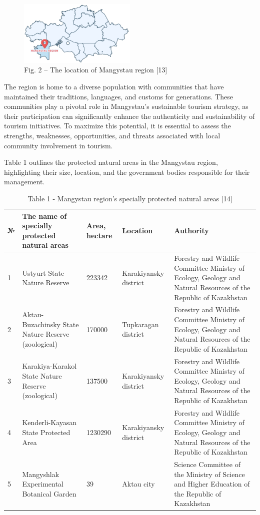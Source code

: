 \begin{figure}[H]
	\centering
	\includegraphics[width=0.5\textwidth]{assets/338}
	\caption*{Fig. 2 -- The location of Mangystau region {[}13{]}}
\end{figure}

\begin{multicols}{2}
The region is home to a diverse population with communities that have
maintained their traditions, languages, and customs for generations.
These communities play a pivotal role in Mangystau's sustainable tourism
strategy, as their participation can significantly enhance the
authenticity and sustainability of tourism initiatives. To maximize this
potential, it is essential to assess the strengths, weaknesses,
opportunities, and threats associated with local community involvement
in tourism.

Table 1 outlines the protected natural areas in the Mangystau region,
highlighting their size, location, and the government bodies responsible
for their management.
\end{multicols}

\begin{table}[H]
\caption*{Table 1 - Mangystau region's specially protected natural areas {[}14{]}}
\centering
\begin{tabular}{|l|p{}|p{}|p{}|p{}|}
\hline
№ & The name of specially protected natural areas & Area, hectare & Location & Authority \\ \hline
1 &
  Ustyurt State Nature Reserve &
  223342 &
  Karakiyansky district &
  Forestry and Wildlife Committee Ministry of Ecology, Geology and Natural Resources of the Republic of Kazakhstan \\ \hline
2 &
  Aktau-Buzachinsky State Nature Reserve (zoological) &
  170000 &
  Tupkaragan district &
  Forestry and Wildlife Committee Ministry of Ecology, Geology and Natural Resources of the Republic of Kazakhstan \\ \hline
3 &
  Karakiya-Karakol State Nature Reserve (zoological) &
  137500 &
  Karakiyansky district &
  Forestry and Wildlife Committee Ministry of Ecology, Geology and Natural Resources of the Republic of Kazakhstan \\ \hline
4 &
  Kenderli-Kayasan State Protected Area &
  1230290 &
  Karakiyansky district &
  Forestry and Wildlife Committee Ministry of Ecology, Geology and Natural Resources of the Republic of Kazakhstan \\ \hline
5 &
  Mangyshlak Experimental Botanical Garden &
  39 &
  Aktau city &
  Science Committee of the Ministry of Science and Higher Education of the Republic of Kazakhstan \\ \hline
\end{tabular}
\end{table}

